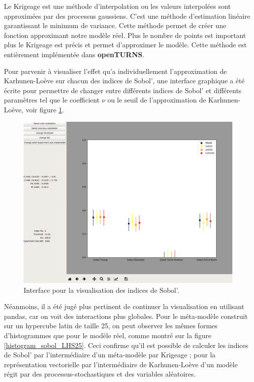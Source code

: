 \documentclass[a4paper,10pt]{article}
\begin{document}
 Le Krigeage est une méthode d'interpolation ou les valeurs interpolées sont approximées par des processus gaussiens. C'est une méthode d'estimation linéaire garantissant le minimum de variance. Cette méthode permet de créer une fonction approximant notre modèle réel. Plus le nombre de points est important plus le Krigeage est précis et permet d'approximer le modèle. Cette méthode est entièrement implémentée dans \textbf{openTURNS}. \par \bigskip
 
 Pour parvenir à visualiser l'effet qu'a individuellement l'approximation de Karhunen-Loève sur chacun des indices de Sobol', une interface graphique a été écrite pour permettre de changer entre différents indices de Sobol' et différents paramètres tel que le coefficient $\nu$ ou le seuil de l'approximation de Karhunen-Loève, voir figure \ref{sobol_interface}. 

\begin{figure}[H]
   \centering
   \noindent \includegraphics[width = \linewidth]{sobol_interface.png}
      \caption{Interface pour la visualisation des indices de Sobol'.}
         \label{sobol_interface}
\end{figure}

 Néanmoins, il a été jugé plus pertinent de continuer la visualisation en utilisant pandas, car on voit des interactions plus globales. Pour le méta-modèle construit sur un hypercube latin de taille 25, on peut observer les mêmes formes d'histogrammes que pour le modèle réel, comme montré sur la figure \ref{histogram_sobol_LHS25}. Ceci confirme qu'il est possible de calculer les indices de Sobol' par l'intermédiaire d'un méta-modèle par Krigeage ; pour la représentation vectorielle par l'intermédiaire de Karhunen-Loève d'un modèle régit par des processus-stochastiques et des variables aléatoires. 
\end{document}
